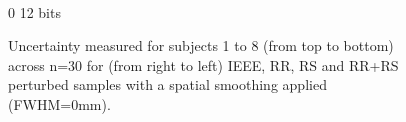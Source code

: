 \documentclass{article}
\begin{document}
\begin{appendices}
\begin{landscape}
\begin{figure}
\begin{subfigure}[t]{0.2\paperheight}
            \end{subfigure} \\
            \hspace*{6cm} 0  12 bits
            \caption{Uncertainty measured for subjects 1 to 8 (from top to bottom) across n=30 for
                (from right to left) IEEE, RR, RS and RR+RS perturbed samples with a spatial smoothing applied (FWHM=0mm). }
            \label{fig:uncertainty_0mm}

        \end{figure}
    \end{landscape}


    \begin{landscape}
        \begin{figure}


\end{figure}
\end{landscape}
\end{appendices}
\end{document}
